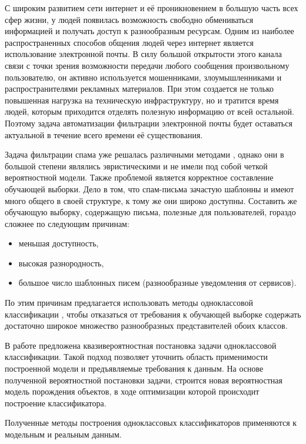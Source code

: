 С широким развитием сети интернет и её проникновением в большую часть всех сфер жизни, у людей появилась возможность свободно обмениваться информацией и получать доступ к разнообразным ресурсам.
Одним из наиболее распространенных способов общения людей через интернет является использование электронной почты.
В силу большой открытости этого канала связи с точки зрения возможности передачи любого сообщения произвольному пользователю, он активно используется мошенниками, злоумышленниками и распространителями рекламных материалов. При этом создается не только повышенная нагрузка на техническую инфраструктуру, но и тратится время людей, которым приходится отделять полезную информацию от всей остальной.
Поэтому задача автоматизации фильтрации электронной почты будет оставаться актуальной в течение всего времени её существования.

Задача фильтрации спама уже решалась различными методами \cite{Islam2007, Sun2008}, однако они в большой степени являлись эвристическими и не имели под собой четкой вероятностной модели.
Также проблемой является корректное составление обучающей выборки.
Дело в том, что спам-письма зачастую шаблонны и имеют много общего в своей структуре, к тому же они широко доступны.
Составить же обучающую выборку, содержащую письма, полезные для пользователей, гораздо сложнее по следующим причинам:
\begin{itemize}
	\item меньшая доступность,
	\item высокая разнородность,
	\item большое число шаблонных писем (разнообразные уведомления от сервисов).
\end{itemize}
По этим причинам предлагается использовать методы одноклассовой классификации \cite{Tax2001, Khan2006}, чтобы отказаться от требования к обучающей выборке содержать достаточно широкое множество разнообразных представителей обоих классов.

В работе предложена квазивероятностная постановка задачи одноклассовой классификации.
Такой подход позволяет уточнить область применимости построенной модели и предъявляемые требования к данным.
На основе полученной вероятностной постановки задачи, строится новая вероятностная модель порождения объектов, в ходе оптимизации которой происходит построение классификатора. %

Полученные методы построения одноклассовых классификаторов применяются к модельным и реальным данным.
